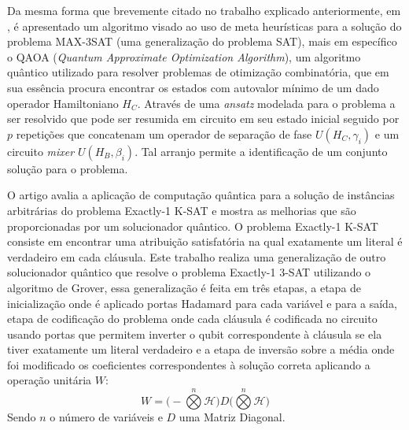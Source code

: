 \documentclass[12pt]{article}
\begin{document}

Da mesma forma que brevemente citado no trabalho explicado anteriormente, em \cite{mandl:24}, é apresentado um algoritmo visado ao uso de meta heurísticas para a solução do problema MAX-3SAT (uma generalização do problema SAT), mais em específico o QAOA (\textit{Quantum Approximate Optimization Algorithm}), um algoritmo quântico utilizado para resolver problemas de otimização combinatória, que em sua essência procura encontrar os estados com autovalor mínimo de um dado operador Hamiltoniano $H_C$. Através de uma \textit{ansatz} modelada para o problema a ser resolvido que pode ser resumida em circuito em seu estado inicial seguido por $p$ repetições que concatenam um operador de separação de fase $U(H_C,\gamma_i)$ e um circuito \textit{mixer} $U(H_B, \beta_i)$. Tal arranjo permite a identificação de um conjunto solução para o problema.


O artigo \cite{piro:20} avalia a aplicação de computação quântica para a solução de instâncias arbitrárias do problema Exactly-1 K-SAT e mostra as melhorias que são proporcionadas por um solucionador quântico. O problema Exactly-1 K-SAT consiste em encontrar uma atribuição satisfatória na qual exatamente um literal é verdadeiro em cada cláusula. Este trabalho realiza uma generalização de outro solucionador quântico que resolve o problema Exactly-1 3-SAT utilizando o algoritmo de Grover, essa generalização é feita em três etapas, a etapa de inicialização onde é aplicado portas Hadamard para cada variável e para a saída, etapa de codificação do problema onde cada cláusula é codificada no circuito usando portas que permitem inverter o qubit correspondente à cláusula se ela tiver exatamente um literal verdadeiro e a etapa de inversão sobre a média onde foi modificado os coeficientes correspondentes à solução correta aplicando a operação unitária \(W\):
\[
W = \big( - \overset{n}{\bigotimes} \mathcal{H} \big) D \big( \overset{n}{\bigotimes} \mathcal{H} \big)
\]
Sendo \(n\) o número de variáveis e \(D\) uma Matriz Diagonal.





\end{document}
